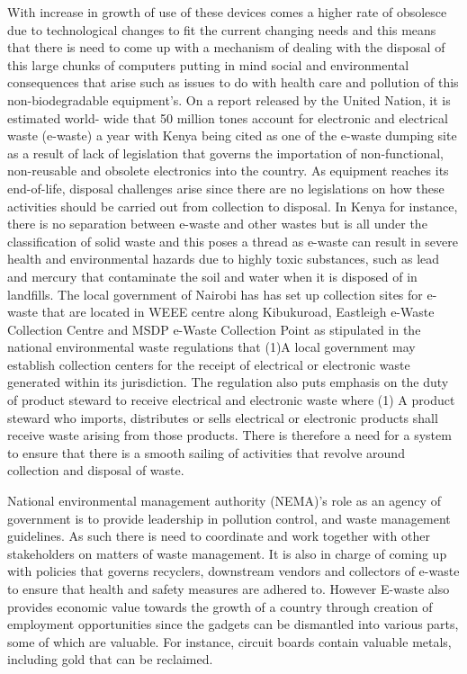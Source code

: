 \documentclass{article}
\begin{document}
With increase in growth of use of these devices comes a higher rate of obsolesce due to technological changes to fit the current changing needs and this means that there is need to come up with a mechanism of dealing with the disposal of this large chunks of computers putting in mind social and environmental consequences that arise such as issues to do with health care and pollution of this non-biodegradable equipment’s. On a report released by the United Nation, it is estimated world- wide that 50 million tones account for electronic and electrical waste (e-waste) a year with Kenya being cited as one of the e-waste dumping site as a result of lack of legislation that governs the importation of non-functional, non-reusable and obsolete electronics into the country\cite{arya2020bioleaching}.
As equipment reaches its end-of-life, disposal challenges arise since there are no legislations on how these activities should be carried out from collection to disposal\cite{songa2015health}. In Kenya for instance, there is no separation between e-waste and other wastes but is all under the classification of solid waste and this poses a thread as e-waste can result in severe health and environmental hazards due to highly toxic substances, such as lead and mercury that contaminate the soil and water when it is disposed of in landfills\cite{maimba2020computer}. The local  government of Nairobi has has set up collection sites for e-waste that are located in WEEE centre along Kibukuroad, Eastleigh e-Waste Collection Centre and MSDP e-Waste Collection Point as stipulated in the national environmental waste regulations that (1)A local government may establish collection centers for the receipt of electrical or electronic waste generated within its jurisdiction. The regulation also puts emphasis on the duty of product steward to receive electrical and electronic waste where (1) A product steward who imports, distributes or sells electrical or electronic products shall receive waste arising from those products. There is therefore a need for a system to ensure that there is a smooth sailing of activities that revolve around collection and disposal of waste.

 National environmental management authority (NEMA)’s role as an agency of government is to provide leadership in pollution control, and waste management guidelines\cite{rithaa2013strategies}. As such there is need to coordinate and work together with other stakeholders on matters of waste management. It is also in charge of coming up with policies that governs recyclers, downstream vendors and collectors of e-waste to ensure that health and safety measures are adhered to.
However E-waste also provides economic value towards the growth of a country through creation of employment opportunities since the gadgets can be dismantled into various parts, some of which are valuable. For instance, circuit boards contain valuable metals, including gold that can be reclaimed\cite{shaikh2020cost}.
\end{document}
